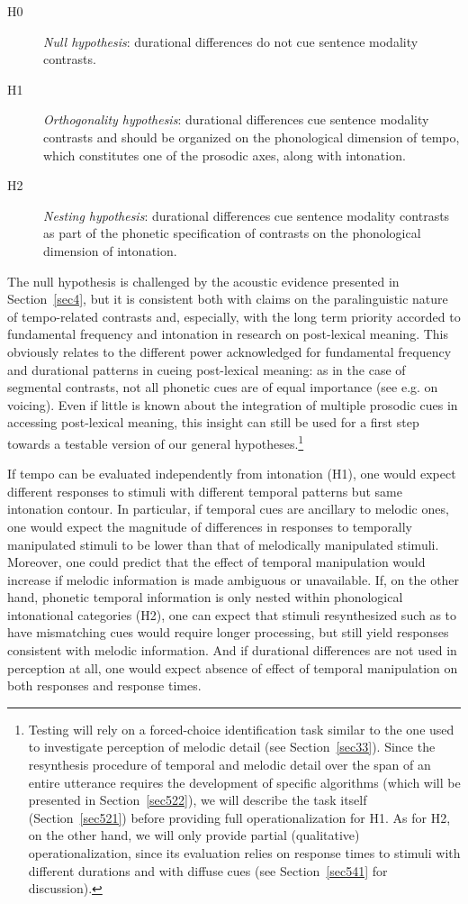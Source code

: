 \begin{description}
   \item[H0] \textit{Null hypothesis}: durational differences do not cue sentence modality contrasts.
   \item[H1] \textit{Orthogonality hypothesis}: durational differences cue sentence modality contrasts and should be organized on the phonological dimension of tempo, which constitutes one of the prosodic axes, along with intonation.
   \item[H2] \textit{Nesting hypothesis}: durational differences cue sentence modality contrasts as part of the phonetic specification of contrasts on the phonological dimension of intonation.
\end{description}

The null hypothesis is challenged by the acoustic evidence presented in Section~\ref{sec4}, but it is consistent both with claims on the paralinguistic nature of tempo-related contrasts and, especially, with the long term priority accorded to fundamental frequency and intonation in research on post-lexical meaning. This obviously relates to the different power acknowledged for fundamental frequency and durational patterns in cueing post-lexical meaning: as in the case of segmental contrasts, not all phonetic cues are of equal importance (see e.g. \citealt{lisker1986voicing} on voicing). Even if little is known about the integration of multiple prosodic cues in accessing post-lexical meaning, this insight can still be used for a first step towards a testable version of our general hypotheses.\footnote{Testing will rely on a forced-choice identification task similar to the one used to investigate perception of melodic detail (see Section~\ref{sec33}). Since the resynthesis procedure of temporal and melodic detail over the span of an entire utterance requires the development of specific algorithms (which will be presented in Section~\ref{sec522}), we will describe the task itself (Section~\ref{sec521}) before providing full operationalization for H1. As for H2, on the other hand, we will only provide partial (qualitative) operationalization, since its evaluation relies on response times to stimuli with different durations and with diffuse cues (see Section~\ref{sec541} for discussion).}

If tempo can be evaluated independently from intonation (H1), one would expect different responses to stimuli with different temporal patterns but same intonation contour. In particular, if temporal cues are ancillary to melodic ones, one would expect the magnitude of differences in responses to temporally manipulated stimuli to be lower than that of melodically manipulated stimuli. Moreover, one could predict that the effect of temporal manipulation would increase if melodic information is made ambiguous or unavailable. If, on the other hand, phonetic temporal information is only nested within phonological intonational categories (H2), one can expect that stimuli resynthesized such as to have mismatching cues would require longer processing, but still yield responses consistent with melodic information. And if durational differences are not used in perception at all, one would expect absence of effect of temporal manipulation on both responses and response times.

